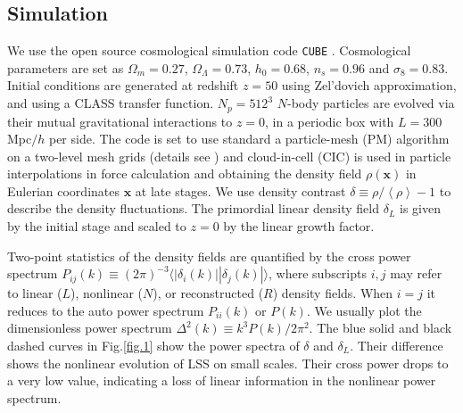 \documentclass[aps,prd,twocolumn,superscriptaddress,amsfont,amssymb,amsmath,nofootinbib,showpacs,balancelastpage]{revtex4-1}
\newcommand{\bs}{\boldsymbol}
\newcommand{\lb}{\left\langle}
\newcommand{\rb}{\right\rangle}
\begin{document}
\subsection{Simulation}\label{ss.sim}
We use the open source cosmological simulation code {\tt CUBE} %
\citep{cafcube}.
Cosmological parameters are set as
$\Omega_m=0.27$, $\Omega_\Lambda=0.73$, $h_0=0.68$, $n_s=0.96$ and $\sigma_8=0.83$.
Initial conditions are generated at redshift $z=50$ 
using Zel'dovich approximation, and using a CLASS transfer function.
$N_p=512^3$ $N$-body particles are evolved via 
their mutual gravitational interactions to $z=0$, in a periodic box with $L=300$ 
Mpc$/h$ per side. The code is set to use standard a particle-mesh (PM) algorithm 
\cite{1988csup.book.....H} on a two-level mesh grids
(details see \cite{2013MNRAS.436..540H}) and cloud-in-cell
(CIC) is used in particle interpolations in force 
calculation and obtaining the density field $\rho({\bs x})$ in Eulerian coordinates 
${\bs x}$ at late stages. We use density contrast $\delta\equiv\rho/\lb\rho\rb-1$ 
to describe the density fluctuations. The primordial linear density field $
\delta_L$ is given by the initial stage and scaled to $z=0$ by the linear growth 
factor.

Two-point statistics of the density fields are quantified by the cross power 
spectrum $P_{ij}(k)\equiv(2\pi)^{-3}\langle|\delta_i(k)||\delta_j(k)|\rangle$, 
where subscripts $i,j$ may refer to linear ($L$), nonlinear ($N$), or reconstructed ($R$) density 
fields. When $i=j$ it reduces to the auto power spectrum $P_{ii}(k)$ or $P(k)$. We 
usually plot the dimensionless power spectrum $\Delta^2(k)\equiv k^3P(k)/2\pi^2$. 
The blue solid and black dashed curves in Fig.\ref{fig.1} show the power spectra of 
$\delta$ and $\delta_L$. Their difference shows the nonlinear evolution of LSS on 
small scales. Their cross power drops to a very low value, indicating a loss of 
linear information in the nonlinear power spectrum.
\end{document}
